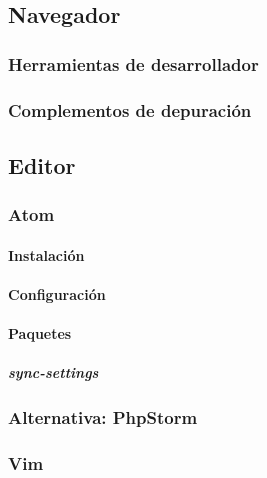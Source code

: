 \documentclass[a4paper,11pt,spanish]{sphinxmanual}
\begin{document}
\subsection{Navegador}
\label{\detokenize{contenidos:id29}}

\subsubsection{Herramientas de desarrollador}
\label{\detokenize{contenidos:id30}}

\subsubsection{Complementos de depuración}
\label{\detokenize{contenidos:id31}}

\subsection{Editor}
\label{\detokenize{contenidos:id32}}

\subsubsection{Atom}
\label{\detokenize{contenidos:id33}}

\paragraph{Instalación}
\label{\detokenize{contenidos:id34}}

\paragraph{Configuración}
\label{\detokenize{contenidos:id35}}

\paragraph{Paquetes}
\label{\detokenize{contenidos:id36}}

\subparagraph{sync-settings}
\label{\detokenize{contenidos:id37}}

\subsubsection{Alternativa: PhpStorm}
\label{\detokenize{contenidos:id38}}

\subsubsection{Vim}
\label{\detokenize{contenidos:id39}}
\end{document}
